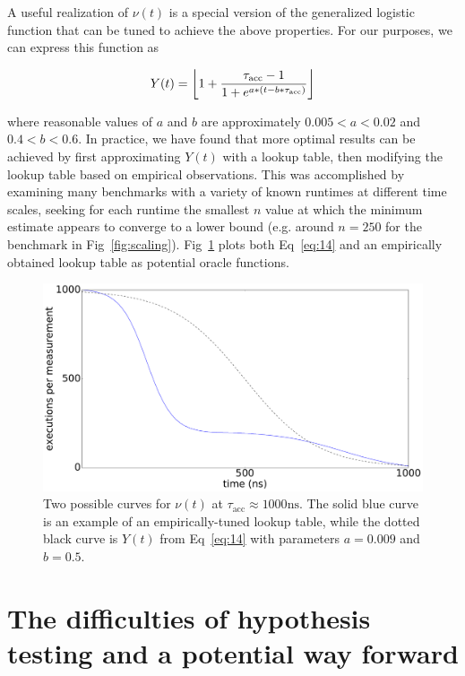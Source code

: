 \documentclass[conference]{IEEEtran}
\DeclarePairedDelimiter\floor{\lfloor}{\rfloor}
\begin{document}
A useful realization of $\nu(t)$ is a special version of the generalized logistic function
that can be tuned to achieve the above properties. For our purposes, we can express this
function as

\begin{equation} \label{eq:14}
    Y(t) = \floor*{1 + \frac{\tau_{\textrm{acc}} - 1}{1 + e^{a * (t - b*\tau_{\textrm{acc}})}}}
\end{equation}

where reasonable values of $a$ and $b$ are approximately $0.005 < a < 0.02$ and $0.4 < b <
0.6$. In practice, we have found that more optimal results can be achieved by first
approximating $Y(t)$ with a lookup table, then modifying the lookup table based on empirical
observations. This was accomplished by examining many benchmarks with a variety of known
runtimes at different time scales, seeking for each runtime the smallest $n$ value at which
the minimum estimate appears to converge to a lower bound (e.g. around $n = 250$ for the
benchmark in Fig~\ref{fig:scaling}). Fig~\ref{fig:oracle} plots both Eq~\ref{eq:14} and an
empirically obtained lookup table as potential oracle functions.

\begin{figure}
\centering
\includegraphics[width=\columnwidth]{figures/fig5/oracle}
\caption{Two possible curves for $\nu(t)$ at $\tau_{\textrm{acc}} \approx 1000 \textrm{ns}$.
The solid blue curve is an example of an empirically-tuned lookup table, while the dotted
black curve is $Y(t)$ from Eq~\ref{eq:14} with parameters $a = 0.009$ and $b = 0.5$.}
\label{fig:oracle}
\end{figure}

\section{The difficulties of hypothesis testing and a potential way forward}
\label{sec:hypotesting}
\end{document}
